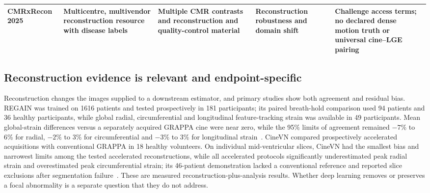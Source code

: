 {\begin{longtable}{L{0.12\textwidth}L{0.14\textwidth}L{0.18\textwidth}L{0.16\textwidth}L{0.20\textwidth}}
\addlinespace
CMRxRecon 2025~\cite{cmrxrecon2025official} & Multicentre, multivendor reconstruction resource with disease labels & Multiple CMR contrasts and reconstruction and quality-control material & Reconstruction robustness and domain shift & Challenge access terms; no declared dense motion truth or universal cine--LGE pairing \\
\bottomrule
\end{longtable}
}

\subsection{Reconstruction evidence is relevant and endpoint-specific}

Reconstruction changes the images supplied to a downstream estimator, and primary studies show both agreement and residual bias. REGAIN was trained on 1616 patients and tested prospectively in 181 participants; its paired breath-hold comparison used 94 patients and 36 healthy participants, while global radial, circumferential and longitudinal feature-tracking strain was available in 49 participants. Mean global-strain differences versus a separately acquired GRAPPA cine were near zero, while the 95\% limits of agreement remained \(-7\%\) to 6\% for radial, \(-2\%\) to 3\% for circumferential and \(-3\%\) to 3\% for longitudinal strain~\cite{yoon2023regain}. CineVN compared prospectively accelerated acquisitions with conventional GRAPPA in 18 healthy volunteers. On individual mid-ventricular slices, CineVN had the smallest bias and narrowest limits among the tested accelerated reconstructions, while all accelerated protocols significantly underestimated peak radial strain and overestimated peak circumferential strain; its 46-patient demonstration lacked a conventional reference and reported slice exclusions after segmentation failure~\cite{vornehm2024cinevn}. These are measured reconstruction-plus-analysis results. Whether deep learning removes or preserves a focal abnormality is a separate question that they do not address.

